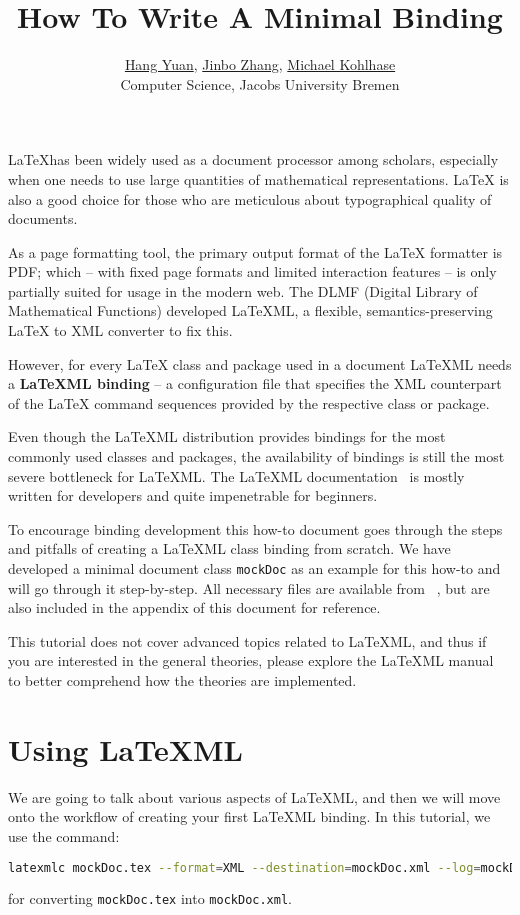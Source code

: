 \documentclass[a4paper]{article}
\title{\textbf{How To Write A Minimal \latexml Binding}}
\author{\href{mailto:h.yuan@jacobs-university.de}{Hang Yuan}, 
	\href{mailto:jin.zhang@jacobs-university.de}{Jinbo Zhang},
        \href{mailto:m.kohlhase@jacobs-university.de}{Michael Kohlhase}\\
        Computer Science, Jacobs University Bremen}
\date{}
\def\latexml{{\LaTeX}ML\xspace}
\begin{document}
\maketitle

{\LaTeX}has been widely used as a document processor among scholars, especially when one
needs to use large quantities of mathematical representations. {\LaTeX} is also a good
choice for those who are meticulous about typographical quality of documents.

As a page formatting tool, the primary output format of the {\LaTeX} formatter is PDF;
which -- with fixed page formats and limited interaction features -- is only partially
suited for usage in the modern web. The DLMF (Digital Library of Mathematical Functions)
developed \latexml, a flexible, semantics-preserving {\LaTeX} to XML converter to fix
this.

However, for every {\LaTeX} class and package used in a document \latexml needs a
\textbf{\latexml binding} -- a configuration file that specifies the XML counterpart of
the {\LaTeX} command sequences provided by the respective class or package. 

Even though the \latexml distribution provides bindings for the most commonly used classes
and packages, the availability of bindings is still the most severe bottleneck for
\latexml. The \latexml documentation~\cite{manual} is mostly written for developers and
quite impenetrable for beginners.

To encourage binding development this how-to document goes through the steps and pitfalls
of creating a \latexml class binding from scratch. We have developed a minimal document
class \lstinline|mockDoc| as an example for this how-to and will go through it
step-by-step. All necessary files are available from ~\cite {mockDoc.git}, but are also
included in the appendix of this document for reference.  

This tutorial does not cover advanced topics related to \latexml, and thus if you are
interested in the general theories, please explore the \latexml manual~\cite{manual} to
better comprehend how the theories are implemented.

\section{Using LaTeXML}
We are going to talk about various aspects of \latexml, and then we will move onto the workflow of creating your first \latexml binding. In this tutorial, we use the command:
\begin{lstlisting}[language=bash]
latexmlc mockDoc.tex --format=XML --destination=mockDoc.xml --log=mockDoc.xml.log
\end{lstlisting}
for converting \lstinline|mockDoc.tex| into \lstinline|mockDoc.xml|. 
\end{document}
